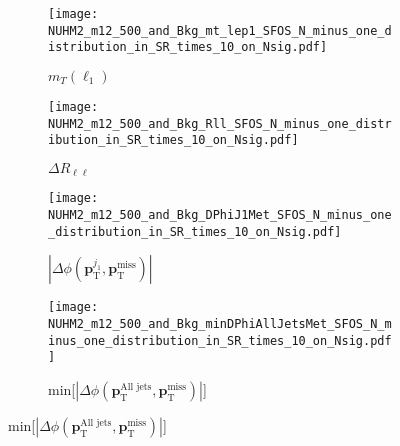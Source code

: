 \begin{figure}[htbp]
    \begin{center}
        \begin{subfigure}[b]{0.48\textwidth}
            \texttt{[image: NUHM2\_m12\_500\_and\_Bkg\_mt\_lep1\_SFOS\_N\_minus\_one\_distribution\_in\_SR\_times\_10\_on\_Nsig.pdf]}
            \caption{$m_{T}(\ell_{1})$}
            \label{fig:event_nuhm2_m12_500_mt_lep1_SFOS}
        \end{subfigure}
        \begin{subfigure}[b]{0.48\textwidth}
            \texttt{[image: NUHM2\_m12\_500\_and\_Bkg\_Rll\_SFOS\_N\_minus\_one\_distribution\_in\_SR\_times\_10\_on\_Nsig.pdf]}
            \caption{$\Delta R_{\ell\ell}$}
            \label{fig:event_nuhm2_m12_500_Rll_SFOS}
        \end{subfigure}
        \begin{subfigure}[b]{0.48\textwidth}
            \texttt{[image: NUHM2\_m12\_500\_and\_Bkg\_DPhiJ1Met\_SFOS\_N\_minus\_one\_distribution\_in\_SR\_times\_10\_on\_Nsig.pdf]}
            \caption{$|\Delta \phi(\mathbf{p}^{j_{1}}_{\mathrm{T}}, \mathbf{p}^{\mathrm{miss}}_{\mathrm{T}})|$}
            \label{fig:event_nuhm2_m12_500_DPhiJ1Met_SFOS}
        \end{subfigure}
        \begin{subfigure}[b]{0.48\textwidth}
            \texttt{[image: NUHM2\_m12\_500\_and\_Bkg\_minDPhiAllJetsMet\_SFOS\_N\_minus\_one\_distribution\_in\_SR\_times\_10\_on\_Nsig.pdf]}
            \caption{min[$|\Delta \phi(\mathbf{p}^{\textrm{All jets}}_{\mathrm{T}}, \mathbf{p}^{\mathrm{miss}}_{\mathrm{T}})|$]}
            \label{fig:event_nuhm2_m12_500_minDPhiAllJetsMet_SFOS}
        \end{subfigure}
    \end{center}

\end{figure}
